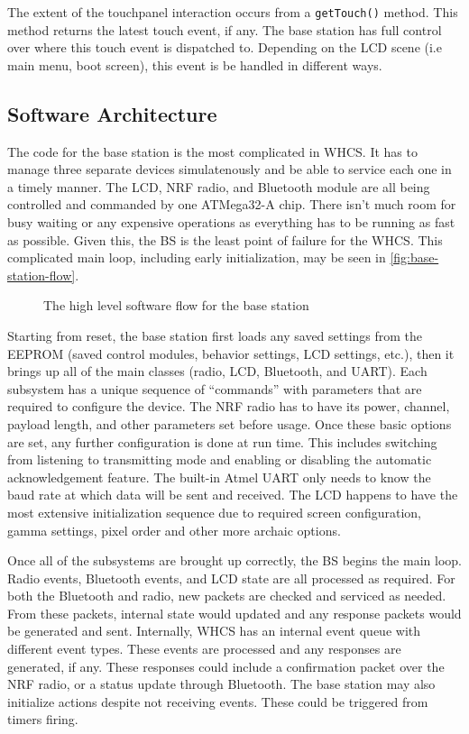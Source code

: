 \documentclass[draft,twocolumn,letterpaper,10pt]{IEEEtran}
\newcommand{\ucffig}[3]{
\begin{figure}[h]
\centering
\makebox[\linewidth][c]{
#2
}
\caption{#3}
\label{#1}
\end{figure}
}
\newcommand{\ucfgfx}[4][scale=1.0]{
\ucffig{#2}{\texttt{[image: \#3]}}{#4}
}
\begin{document}
The extent of the touchpanel interaction occurs from a \texttt{getTouch()}
method. This method returns the latest touch event, if any. The base
station has full control over where this touch event is dispatched to.
Depending on the LCD scene (i.e main menu, boot screen), this event is be
handled in different ways.

\subsection{Software Architecture}
The code for the base station is the most complicated in WHCS. It has to manage
three separate devices simulatenously and be able to service each one in a
timely manner. The LCD, NRF radio, and Bluetooth module are all being
controlled and commanded by one ATMega32-A chip. There isn't much room for busy
waiting or any expensive operations as everything has to be running as fast as
possible. Given this, the BS is the least point of failure for the WHCS. This
complicated main loop, including early initialization, may be seen in
\autoref{fig:base-station-flow}.

\ucfgfx[width=0.8\linewidth]{fig:base-station-flow}{base-station-flow}{The high level software flow for the base station}

Starting from reset, the base station first loads any saved settings from the
EEPROM (saved control modules, behavior settings, LCD settings, etc.), then it
brings up all of the main classes (radio, LCD, Bluetooth, and UART).
Each subsystem has a unique sequence of ``commands'' with parameters that are
required to configure the device. The NRF radio has to have its power, channel,
payload length, and other parameters set before usage. Once these basic
options are set, any further configuration is done at run time. This includes
switching from listening to transmitting mode and enabling or disabling the
automatic acknowledgement feature. The built-in Atmel UART only needs to know
the baud rate at which data will be sent and received. 
The LCD happens to have the most extensive initialization sequence due to
required screen configuration, gamma settings, pixel order and other more
archaic options.

Once all of the subsystems are brought up correctly, the BS begins the main loop.
Radio events, Bluetooth events, and LCD state are all processed as
required. For both the Bluetooth and radio, new packets are checked
and serviced as needed. From these packets, internal state would updated and any
response packets would be generated and sent. Internally, WHCS has an
internal event queue with different event types. These events are processed
and any responses are generated, if any. These responses could include a
confirmation packet over the NRF radio, or a status update through Bluetooth.
The base station may also initialize actions despite not receiving events.
These could be triggered from timers firing.
\end{document}

